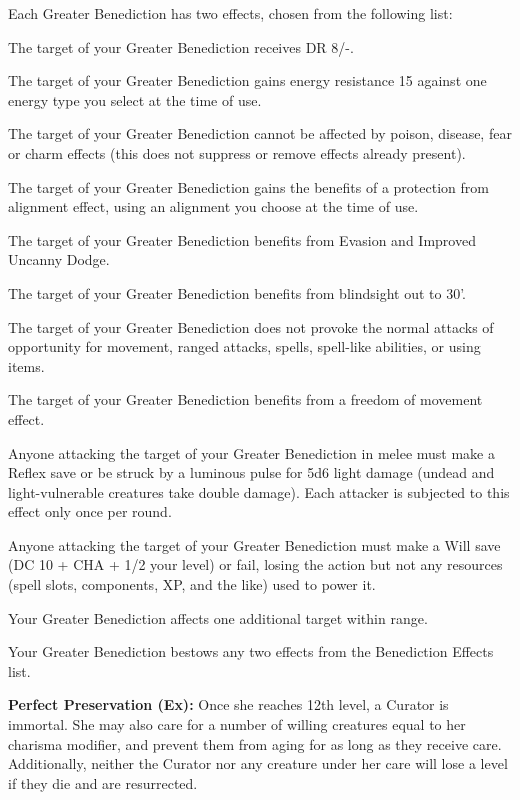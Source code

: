 Each Greater Benediction has two effects, chosen from the following list:
\begin{itemize*}
\item The target of your Greater Benediction receives DR 8/-.
\item The target of your Greater Benediction gains energy resistance 15 against one energy type you select at the time of use.
\item The target of your Greater Benediction cannot be affected by poison, disease, fear or charm effects (this does not suppress or remove effects already present).
\item The target of your Greater Benediction gains the benefits of a protection from alignment effect, using an alignment you choose at the time of use.
\item The target of your Greater Benediction benefits from Evasion and Improved Uncanny Dodge.
\item The target of your Greater Benediction benefits from blindsight out to 30'.
\item The target of your Greater Benediction does not provoke the normal attacks of opportunity for movement, ranged attacks, spells, spell-like abilities, or using items.
\item The target of your Greater Benediction benefits from a freedom of movement effect.
\item Anyone attacking the target of your Greater Benediction in melee must make a Reflex save or be struck by a luminous pulse for 5d6 light damage (undead and light-vulnerable creatures take double damage). Each attacker is subjected to this effect only once per round.
\item Anyone attacking the target of your Greater Benediction must make a Will save (DC 10 + CHA + 1/2 your level) or fail, losing the action but not any resources (spell slots, components, XP, and the like) used to power it.
\item Your Greater Benediction affects one additional target within range.
\item Your Greater Benediction bestows any two effects from the Benediction Effects list.
\end{itemize*}

\textbf{Perfect Preservation (Ex):} Once she reaches 12th level, a Curator is immortal. She may also care for a number of willing creatures equal to her charisma modifier, and prevent them from aging for as long as they receive care. Additionally, neither the Curator nor any creature under her care will lose a level if they die and are resurrected.

